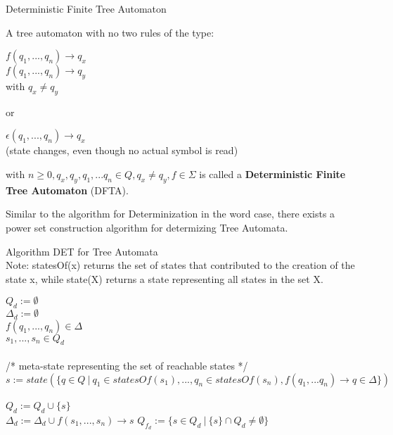\documentclass{llncs}
\begin{document}
\begin{definition}{Deterministic Finite Tree Automaton}

	A tree automaton with no two rules of the type:
	\begin{center}
		\(f(q_1,..., q_n) \rightarrow q_x\)\\
		\(f(q_1,...,q_n) \rightarrow q_y\)\\
		with \(q_x \neq q_y\) \\
	\end{center}
	or
	\begin{center}
		\(\epsilon(q_1, ..., q_n) \rightarrow q_x\)\\
		(state changes, even though no actual symbol is read)
	\end{center}
	with \(n \ge 0, q_x,q_y,q_1,...q_n \in Q, q_x \neq q_y, f \in \Sigma\)
	is called a \textbf{Deterministic Finite Tree Automaton} (DFTA).
\end{definition}

Similar to the algorithm for Determinization in the word case, there exists a power set construction algorithm for determizing Tree Automata.

\begin{definition}{Algorithm DET for Tree Automata \cite{tata-nfta}}\\
	Note: statesOf(x) returns the set of states that contributed to the creation of the state x, while state(X) returns a state representing all states in the set X.
\begin{algorithm}[H]
	\(Q_d := \emptyset\)\\
	\(\Delta_d := \emptyset\)
	\\
		 {
			\( f(q_1,...,q_n) \in \Delta\)\\
			\(s_1,...,s_n \in Q_d\)\\
			~\\
			/* meta-state representing the set of reachable states */ \\
			\( s := state(\{ q \in Q ~|~ q_1 \in statesOf(s_1),..., q_n \in statesOf(s_n), f(q_1,...q_n) \rightarrow q \in \Delta \}) \)\\~\\
			\(Q_d := Q_d \cup \{s\}\)\\
			\(\Delta_d := \Delta_d \cup f(s_1,...,s_n) \rightarrow s \)
		}
	\(Q_{f_d} := \{ s \in Q_d ~ | ~ \{s\} \cap Q_d \neq \emptyset \}\)\\
\end{algorithm}
\end{definition}
\end{document}
